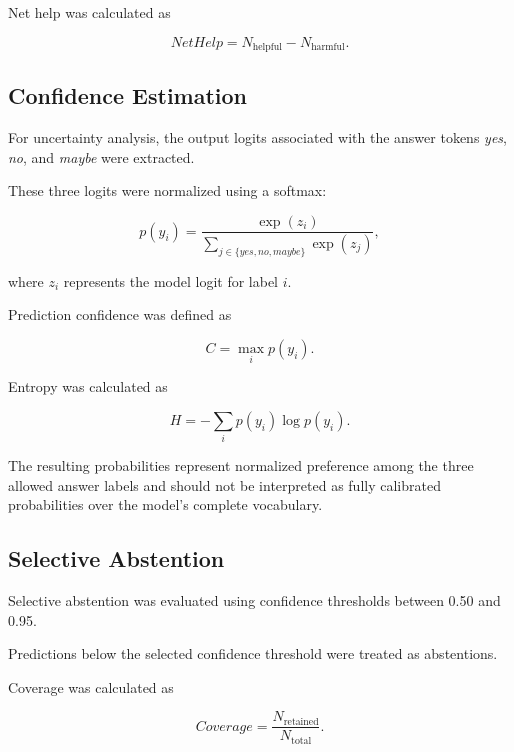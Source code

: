 \documentclass[conference]{IEEEtran}
\begin{document}
Net help was calculated as

\begin{equation}
NetHelp =
N_{\text{helpful}}
-
N_{\text{harmful}}.
\end{equation}

\subsection{Confidence Estimation}

For uncertainty analysis, the output logits associated with the answer tokens \textit{yes}, \textit{no}, and \textit{maybe} were extracted.

These three logits were normalized using a softmax:

\begin{equation}
p(y_i) =
\frac{\exp(z_i)}
{\sum_{j \in \{yes,no,maybe\}} \exp(z_j)},
\end{equation}

where $z_i$ represents the model logit for label $i$.

Prediction confidence was defined as

\begin{equation}
C = \max_i p(y_i).
\end{equation}

Entropy was calculated as

\begin{equation}
H =
-\sum_i p(y_i)\log p(y_i).
\end{equation}

The resulting probabilities represent normalized preference among the three allowed answer labels and should not be interpreted as fully calibrated probabilities over the model's complete vocabulary.

\subsection{Selective Abstention}

Selective abstention was evaluated using confidence thresholds between 0.50 and 0.95.

Predictions below the selected confidence threshold were treated as abstentions.

Coverage was calculated as

\begin{equation}
Coverage =
\frac{N_{\text{retained}}}
{N_{\text{total}}}.
\end{equation}
\end{document}
